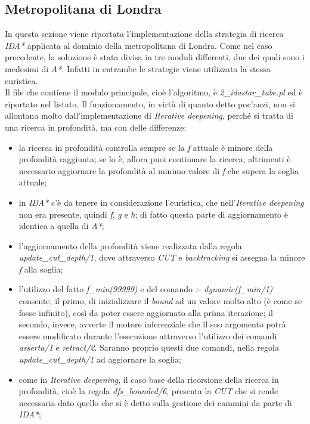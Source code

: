 \documentclass[12pt]{report}
\begin{document}
\subsection{Metropolitana di Londra}
In questa sezione viene riportata l'implementazione della strategia di ricerca \emph{IDA*} applicata al dominio della metropolitana di Londra.
Come nel caso precedente, la soluzione è stata divisa in tre moduli differenti, due dei quali sono i medesimi di \emph{A*}. Infatti in entrambe le strategie viene utilizzata la stessa euristica.\\
 Il file che contiene il modulo principale, cioè l'algoritmo, è \emph{2\_idastar\_tube.pl} ed è riportato nel listato.
Il funzionamento, in virtù di quanto detto poc'anzi, non si allontana molto dall'implementazione di \emph{Iterative deepening}, perché si tratta di una ricerca in profondità, ma con delle differenze:

\begin{itemize}
\item la ricerca in profondità controlla sempre se la \emph{f} attuale è minore della profondità raggiunta; se lo è, allora puoi continuare la ricerca, altrimenti è necessario aggiornare la profondità al minimo valore di \emph{f} che supera la soglia attuale;
\item in \emph{IDA*} c'è da tenere in considerazione l'euristica, che nell'\emph{Iterative deepening} non era presente, quindi \emph{f}, \emph{g} e \emph{h}; di fatto questa parte di aggiornamento è identica a quella di \emph{A*};
\item l'aggiornamento della profondità viene realizzata dalla regola \emph{update\_cut\_depth/1}, dove attraverso \emph{CUT} e \emph{backtracking} si assegna la minore \emph{f} alla soglia;
\item l'utilizzo del fatto \emph{f\_min(99999)} e del comando \emph{:- dynamic(f\_min/1)} consente, il primo, di inizializzare il \emph{bound} ad un valore molto alto (è come se fosse infinito), così da poter essere aggiornato alla prima iterazione; il secondo, invece, avverte il motore inferenziale che il suo argomento potrà essere modificato durante l'esecuzione attraverso l'utilizzo dei comandi \emph{asserta/1} e \emph{retract/2}. Saranno proprio questi due comandi, nella regola \emph{update\_cut\_depth/1} ad aggiornare la soglia;
\item come in \emph{Iterative deepening}, il caso base della ricorsione della ricerca in profondità, cioè la regola \emph{dfs\_bounded/6}, presenta la \emph{CUT} che si rende necessaria dato quello che si è detto sulla gestione dei cammini da parte di \emph{IDA*};
\end{itemize}
\end{document}
